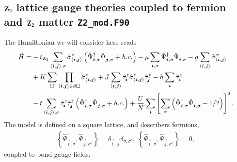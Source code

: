 

\subsection{$\mathbf{Z}_{2}$ lattice gauge theories coupled to fermion and $\mathbf{Z}_{2}$ matter  \texttt{Z2\_mod.F90}} \label{Z2.Sec}

The Hamiltonian we will consider here reads
\begin{align}
	\hat{H} =& -  t_{\Ztwo} \sum_{\langle \vec{i}, \vec{j} \rangle, \sigma } \hat{\sigma}^z_{\langle \vec{i}, \vec{j} \rangle}
	\left(\hat{\Psi}^{\dagger}_{\vec{i},\sigma} \hat{\Psi}^{\phantom{\dagger}}_{\vec{j},\sigma}   + h.c. \right) - \mu \sum_{\vec{i},\sigma} \hat{\Psi}^{\dagger}_{\vec{i},\sigma} \hat{\Psi}^{\phantom{\dagger}}_{\vec{i},\sigma}  
	-g \sum_{\langle \vec{i}, \vec{j} \rangle } \hat{\sigma}^{x}_{\langle \vec{i}, \vec{j} \rangle } \nonumber \\
	  & +K \sum_{\square} \prod_{\langle \vec{i}, \vec{j} \rangle \in \partial \square} \hat{\sigma}^{z}_{\langle \vec{i}, \vec{j} \rangle}  
	 + J  \sum_{\langle \vec{i}, \vec{j} \rangle}  \hat{\tau}^z_{\pmb{i}}  \hat{\sigma}^{z}_{\langle \vec{i}, \vec{j} \rangle} \hat{\tau}^z_{\pmb{j}}   
	      -  h \sum_{ \vec{i} } \hat{\tau}^x_{\vec{i}} \nonumber \\
	& - t  \sum_{\langle \vec{i}, \vec{j} \rangle, \sigma }   \hat{\tau}^z_{\pmb{i}}   \hat{\tau}^z_{\pmb{j}}  \left( \hat{\Psi}^{\dagger}_{\vec{i},\sigma} \hat{\Psi}^{\phantom{\dagger}}_{\vec{j},\sigma} 	+ h.c. \right) + \frac{U}{N}\sum_{\ve{i}} \left[ \sum_{\sigma}  \left( \hat{\Psi}^{\dagger}_{\ve{i},\sigma}  \hat{\Psi}^{\phantom\dagger}_{\ve{i},\sigma} - 1/2\right) \right]^2.
\end{align}  
The model is defined on a square lattice, and describers fermions, 
\begin{align}
 \left\{ \hat{\Psi}^{\dagger}_{\vec{i},\sigma},  \hat{\Psi}^{\phantom\dagger}_{\vec{j},\sigma'} \right\}  = \delta_{\vec{i},\vec{j}} \delta_{\sigma,\sigma'}, \;  
\left\{ \hat{\Psi}^{\phantom\dagger}_{\vec{i},\sigma},  \hat{\Psi}^{\phantom\dagger}_{\vec{j},\sigma'} \right\}  =  0,  
\end{align}
coupled to  bond gauge fields, 
